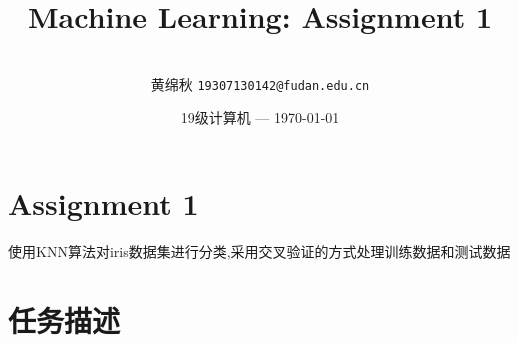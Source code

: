 \documentclass[utf-8]{article}
\title{Machine Learning: Assignment 1} %
\author{\\黄绵秋 \texttt{19307130142@fudan.edu.cn}} %
\date{19级计算机 --- \today} %
\begin{document}
\maketitle %


\section*{Assignment 1} %

使用KNN算法对iris数据集进行分类,采用交叉验证的方式处理训练数据和测试数据





\section{{任务描述}} %

\end{document}
